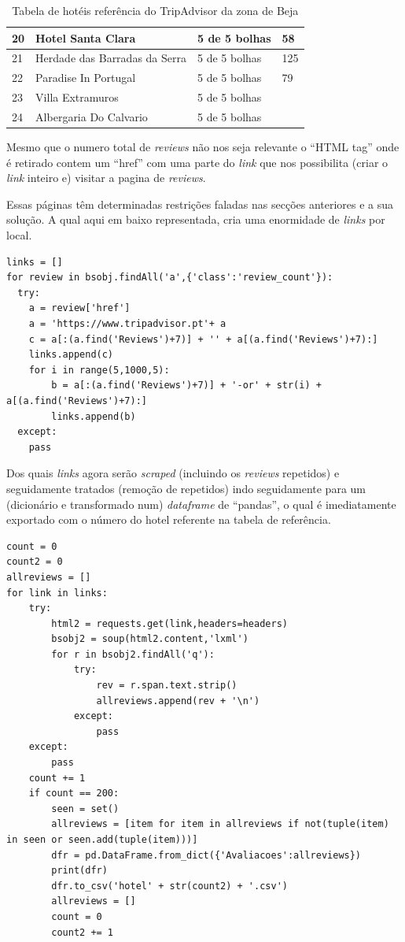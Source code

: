 \documentclass[a4paper,10pt]{article}
\begin{document}
\begin{table}[!ht]
\begin{tabular}{|l|l|l|l|}
    20 & Hotel Santa Clara                   & 5 de 5 bolhas   & 58    \\ \hline
    21 & Herdade das Barradas da Serra       & 5 de 5 bolhas   & 125   \\ \hline
    22 & Paradise In Portugal                & 5 de 5 bolhas   & 79    \\ \hline
    23 & Villa Extramuros                    & 5 de 5 bolhas   & ~     \\ \hline
    24 & Albergaria Do Calvario              & 5 de 5 bolhas   & ~     \\ \hline
  \end{tabular}
  \caption{Tabela de hotéis referência do TripAdvisor da zona de Beja}
\end{table}

\newpage

Mesmo que o numero total de \textit{reviews} não nos seja relevante o ``HTML tag'' onde é retirado contem um ``href'' com uma parte do \textit{link} que nos possibilita (criar o \textit{link} inteiro e) visitar a pagina de \textit{reviews}.

Essas páginas têm determinadas restrições faladas nas secções anteriores e a sua solução. A qual aqui em baixo representada, cria uma enormidade de \textit{links} por local.

\begin{verbatim}
links = []
for review in bsobj.findAll('a',{'class':'review_count'}):
  try:
    a = review['href']
    a = 'https://www.tripadvisor.pt'+ a
    c = a[:(a.find('Reviews')+7)] + '' + a[(a.find('Reviews')+7):]
    links.append(c)
    for i in range(5,1000,5):
        b = a[:(a.find('Reviews')+7)] + '-or' + str(i) + a[(a.find('Reviews')+7):]
        links.append(b)
  except:
    pass
\end{verbatim}

Dos quais \textit{links} agora serão \textit{scraped} (incluindo os \textit{reviews} repetidos) e seguidamente tratados (remoção de repetidos) indo seguidamente para um (dicionário e transformado num) \textit{dataframe} de ``pandas'', o qual é imediatamente exportado com o número do hotel referente na tabela de referência.

\begin{verbatim}
count = 0
count2 = 0
allreviews = []
for link in links:
    try:
        html2 = requests.get(link,headers=headers)
        bsobj2 = soup(html2.content,'lxml')
        for r in bsobj2.findAll('q'):
            try:
                rev = r.span.text.strip()
                allreviews.append(rev + '\n')
            except:
                pass
    except:
        pass
    count += 1
    if count == 200:
        seen = set()
        allreviews = [item for item in allreviews if not(tuple(item) in seen or seen.add(tuple(item)))]
        dfr = pd.DataFrame.from_dict({'Avaliacoes':allreviews})
        print(dfr)
        dfr.to_csv('hotel' + str(count2) + '.csv')
        allreviews = []
        count = 0
        count2 += 1
\end{verbatim}
\end{document}

